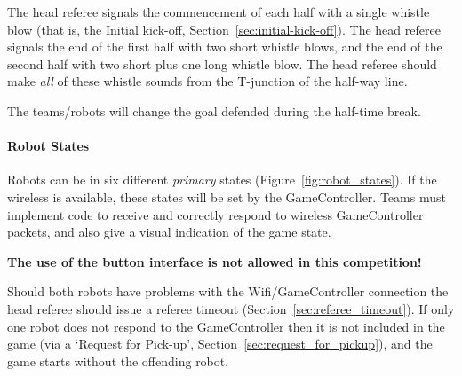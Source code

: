 The head referee signals the commencement of each half with a single whistle blow (that is, the Initial kick-off, \cf Section~\ref{sec:initial-kick-off}).
The head referee signals the end of the first half with two short whistle blows, and the end of the second half with two short plus one long whistle blow.
The head referee should make \textit{all} of these whistle sounds from the T-junction of the half-way line.

The teams/robots will change the goal defended during the half-time break.

\paragraph{Robot States}
\label{sec:robot_states}

Robots can be in six different \emph{primary} states (\cf Figure~\ref{fig:robot_states}). If the wireless is available, these states will be set by the GameController. Teams must implement code to receive and correctly respond to wireless GameController packets, and also give a visual indication of the game state.

\textbf{The use of the button interface is not allowed in this competition!} 

Should both robots have problems with the Wifi/GameController connection the head referee should issue a referee timeout (\cf Section~\ref{sec:referee_timeout}).
If only one robot does not respond to the GameController then it is not included in the game (via a `Request for Pick-up', \cf Section~\ref{sec:request_for_pickup}), and the game starts without the offending robot.

